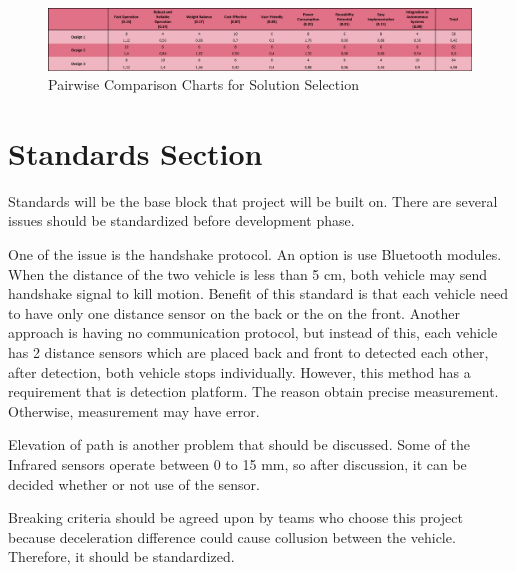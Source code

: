 \documentclass[a4paper,12pt]{article}
\begin{document}
	\begin{figure}[H]
		\centering
		\includegraphics[width=\textwidth,height=\textheight,keepaspectratio]{images/soln_selection} 
		\caption{\label{fig:soln_selection}Pairwise Comparison Charts for Solution Selection}
	\end{figure}





	

\section{Standards Section}
Standards will be the base block that project will be built on. There are several issues should be standardized before development phase. 

One of the issue is the handshake protocol. An option is use Bluetooth modules. When the distance of the two vehicle is less than 5 cm, both vehicle may send handshake signal to kill motion. Benefit of this standard is that each vehicle need to have only one distance sensor on the back or the on the front. Another approach is having no communication protocol, but instead of this, each vehicle has 2 distance sensors which are placed back and front to detected each other, after detection, both vehicle stops individually. However, this method has a requirement that is detection platform. The reason obtain precise measurement. Otherwise, measurement may have error.  

Elevation of path is another problem that should be discussed. Some of the Infrared sensors operate between 0 to 15 mm, so after discussion, it can be decided whether or not use of the sensor. 

Breaking criteria should be agreed upon by teams who choose this project because deceleration difference could cause collusion between the vehicle. Therefore, it should be standardized.      
\end{document}
